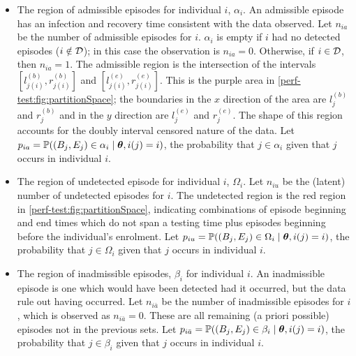 \documentclass[thesis.tex]{subfiles}
\begin{document}
\begin{itemize}
\item
  The region of admissible episodes for individual $i$, $\alpha_i$.
  An admissible episode has an infection and recovery time consistent with the data observed.
  Let $n_{ia}$ be the number of admissible episodes for $i$.
  $\alpha_i$ is empty if $i$ had no detected episodes (\ie $i \notin \mathcal{D}$); in this case the observation is $n_{ia} = 0$.
  Otherwise, if $i \in \mathcal{D}$, then $n_{ia} =1$.
  The admissible region is the intersection of the intervals $[l_{j(i)}^{(b)}, r_{j(i)}^{(b)}]$ and $[l_{j(i)}^{(e)}, r_{j(i)}^{(e)}]$.
  This is the purple area in \cref{perf-test:fig:partitionSpace}; the boundaries in the $x$ direction of the area are $l_j^{(b)}$ and $r_j^{(b)}$ and in the $y$ direction are $l_j^{(e)}$ and $r_j^{(e)}$.
  The shape of this region accounts for the doubly interval censored nature of the data.
  Let $p_{ia} = \operatorname{\mathbb{P}}((B_j, E_j) \in \alpha_i \mid \bm{\theta}, i(j) = i)$, the probability that $j \in \alpha_i$ given that $j$ occurs in individual $i$.
  \label{perf-test:def:admissible}
\item
  The region of undetected episode for individual $i$, $\Omega_i$.
  Let $n_{iu}$ be the (latent) number of undetected episodes for $i$.
  The undetected region is the red region in \cref{perf-test:fig:partitionSpace}, indicating combinations of episode beginning and end times which do not span a testing time plus episodes beginning before the individual's enrolment.
  Let $p_{iu} = \operatorname{\mathbb{P}}((B_j, E_j) \in \Omega_i \mid \bm{\theta}, i(j) = i)$, the probability that $j \in \Omega_i$ given that $j$ occurs in individual $i$.
\item
  The region of inadmissible episodes, $\beta_i$ for individual $i$.
  An inadmissible episode is one which would have been detected had it occurred, but the data rule out having occurred.
  Let $n_{i\bar{a}}$ be the number of inadmissible episodes for $i$, which is observed as $n_{i\bar{a}} = 0$.
  These are all remaining (a priori possible) episodes not in the previous sets.
  Let $p_{i\bar{a}} = \operatorname{\mathbb{P}}((B_j, E_j) \in \beta_i \mid \bm{\theta}, i(j) = i)$, the probability that $j \in \beta_i$ given that $j$ occurs in individual $i$.
\end{itemize}
\end{document}
